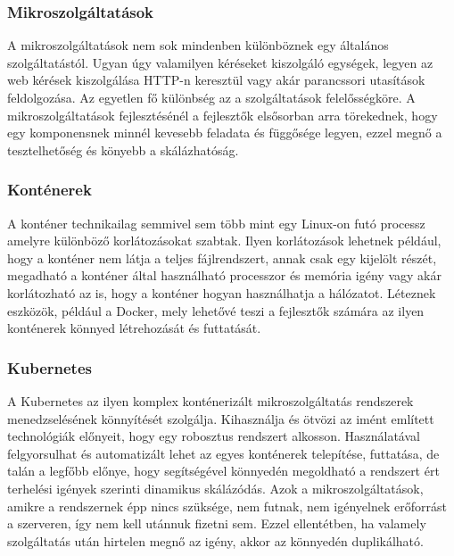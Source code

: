 \subsubsection{Mikroszolgáltatások}
A mikroszolgáltatások nem sok mindenben különböznek egy általános szolgáltatástól. 
Ugyan úgy valamilyen kéréseket kiszolgáló egységek, legyen az web kérések kiszolgálása HTTP-n keresztül
vagy akár parancssori utasítások feldolgozása. Az egyetlen fő különbség az a szolgáltatások felelősségköre.
A mikroszolgáltatások fejlesztésénél a fejlesztők elsősorban arra törekednek, hogy egy komponensnek minnél kevesebb feladata és függősége legyen, 
ezzel megnő a tesztelhetőség és könyebb a skálázhatóság.

\subsubsection{Konténerek}
A konténer technikailag semmivel sem több mint egy Linux-on futó processz amelyre különböző korlátozásokat szabtak.
Ilyen korlátozások lehetnek például, hogy a konténer nem látja a teljes fájlrendszert, annak csak egy kijelölt részét,
megadható a konténer által használható processzor és memória igény vagy akár korlátozható az is, hogy a konténer hogyan használhatja a hálózatot.
Léteznek eszközök, például a Docker\cite{docker}, mely lehetővé teszi a fejlesztők számára az ilyen konténerek könnyed létrehozását és futtatását.

\subsubsection{Kubernetes}
A Kubernetes\cite{kubernetes} az ilyen komplex konténerizált mikroszolgáltatás rendszerek menedzselésének könnyítését szolgálja.
Kihasználja és ötvözi az imént említett technológiák előnyeit, hogy egy robosztus rendszert alkosson. 
Használatával felgyorsulhat és automatizált lehet az egyes konténerek telepítése, futtatása, de talán a legfőbb előnye,
hogy segítségével könnyedén megoldható a rendszert ért terhelési igények szerinti dinamikus skálázódás. 
Azok a mikroszolgáltatások, amikre a rendszernek épp nincs szüksége, nem futnak, nem igényelnek erőforrást a szerveren,
így nem kell utánnuk fizetni sem. Ezzel ellentétben, ha valamely szolgáltatás után hirtelen megnő az igény,
akkor az könnyedén duplikálható.

